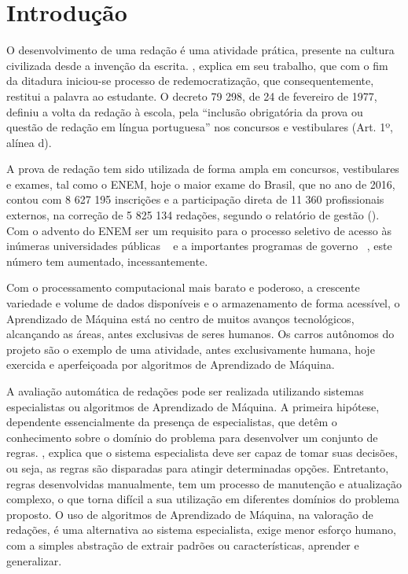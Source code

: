 \newpage
\section{Introdução}

O desenvolvimento de uma redação é uma atividade prática, presente na 
cultura civilizada desde a invenção da escrita. , 
explica em seu trabalho, que com o fim da ditadura iniciou-se processo de 
redemocratização, que consequentemente, restitui a palavra ao estudante. 
O decreto 79 298, de 24 de fevereiro de 1977, definiu a volta da redação à 
escola, pela ``inclusão obrigatória da prova ou questão de redação em língua 
portuguesa'' nos concursos e vestibulares (Art. 1º, alínea d).

A prova de redação tem sido utilizada de forma ampla em concursos, vestibulares 
e exames, tal como o ENEM, hoje o maior exame do Brasil, que no ano de 2016, 
contou com 8 627 195 inscrições e a participação direta de 11 360 profissionais 
externos, na correção de 5 825 134 redações, segundo o relatório de gestão 
\citeauthor{relatorio_de_gestao:2016} (\citeyear{relatorio_de_gestao:2016}). 
Com o advento do ENEM ser um requisito para o processo seletivo de acesso às 
inúmeras universidades públicas ~\cite{sisu:2017} e a importantes programas de 
governo ~\cite{csf:2017}, este número tem aumentado, incessantemente.

Com o processamento computacional mais barato e poderoso, a crescente variedade 
e volume de dados disponíveis e o armazenamento de forma acessível, o 
Aprendizado de Máquina está no centro de muitos avanços tecnológicos, 
alcançando as áreas, antes exclusivas de seres humanos. Os carros autônomos do
projeto  são o exemplo de uma atividade, antes 
exclusivamente humana, hoje exercida e aperfeiçoada por algoritmos de 
Aprendizado de Máquina. 

A avaliação automática de redações pode ser realizada utilizando sistemas
especialistas ou algoritmos de Aprendizado de Máquina. A primeira hipótese, 
dependente essencialmente da presença de especialistas, que detêm o 
conhecimento sobre o domínio do problema para desenvolver um conjunto de 
regras. , explica que o sistema 
especialista deve ser capaz de tomar suas decisões, ou seja, as regras são 
disparadas para atingir determinadas opções. Entretanto, regras desenvolvidas 
manualmente, tem um processo de manutenção e atualização complexo, o que torna 
difícil a sua utilização em diferentes domínios do problema proposto. O uso de 
algoritmos de Aprendizado de Máquina, na valoração de redações, é uma 
alternativa ao sistema especialista, exige menor esforço humano, com a simples 
abstração de extrair padrões ou características, aprender e generalizar. 

